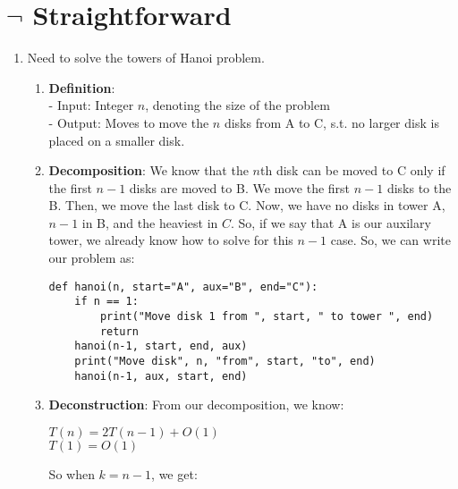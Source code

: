 \documentclass[a4paper]{article}
\begin{document}
\section{$\neg$ Straightforward}
\begin{enumerate}
    \item Need to solve the towers of Hanoi problem.
\begin{enumerate}[label=\roman*]
    \item \textbf{Definition}:\\
    - Input: Integer $n$, denoting the size of the problem \\
    - Output: Moves to move the $n$ disks from A to C, s.t. no larger disk is placed on a smaller disk.

    \item \textbf{Decomposition}: We know that the $n$th disk can be moved to C only if the first $n-1$ disks are moved to B. We move the first $n-1$ disks to the B. Then, we move the last disk to C. Now, we have no disks in tower A, $n-1$ in B, and the heaviest in $C$. So, if we say that A is our auxilary tower, we already know how to solve for this $n-1$ case. So, we can write our problem as:
\begin{verbatim}
def hanoi(n, start="A", aux="B", end="C"):
    if n == 1:
        print("Move disk 1 from ", start, " to tower ", end)
        return
    hanoi(n-1, start, end, aux)
    print("Move disk", n, "from", start, "to", end)
    hanoi(n-1, aux, start, end)
\end{verbatim} 

\item \textbf{Deconstruction}: From our decomposition, we know:
\begin{center}
    $T(n) = 2T(n-1) + O(1)$\\
    $T(1) = O(1)$
\end{center}


So when $k = n-1$, we get:\\


\end{enumerate}
\end{enumerate}
\end{document}
